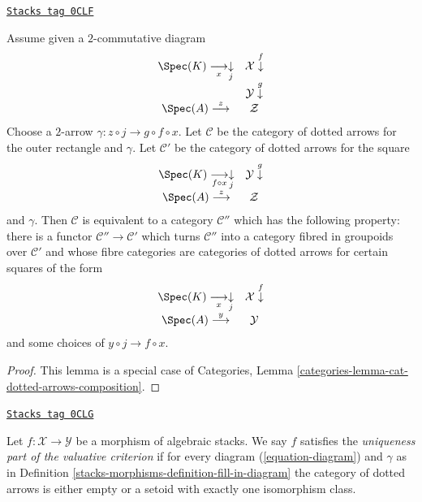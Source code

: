 \begin{lemma}
\label{stacks-morphisms-lemma-cat-dotted-arrows-composition}
\href{https://stacks.math.columbia.edu/tag/0CLF}{\texttt{Stacks tag 0CLF}}

Assume given a $2$-commutative diagram
$$
\begin{array}{cc}\Spec(K) \underset{x}{\longrightarrow}\underset{j}{\downarrow} & \mathcal{X} \overset{f}{\downarrow} \\  & \mathcal{Y} \overset{g}{\downarrow} \\ \Spec(A) \overset{z}{\longrightarrow} & \mathcal{Z}\end{array}
$$
Choose a $2$-arrow $\gamma : z \circ j \to g \circ f \circ x$.
Let $\mathcal{C}$ be the category of dotted arrows for
the outer rectangle and $\gamma$. Let $\mathcal{C}'$ be the
category of dotted arrows for the square
$$
\begin{array}{cc}\Spec(K) \underset{f \circ x}{\longrightarrow}\underset{j}{\downarrow} & \mathcal{Y} \overset{g}{\downarrow} \\ \Spec(A) \overset{z}{\longrightarrow} & \mathcal{Z}\end{array}
$$
and $\gamma$. Then $\mathcal{C}$ is equivalent to a category $\mathcal{C}''$
which has the following property: there is
a functor $\mathcal{C}'' \to \mathcal{C}'$
which turns $\mathcal{C}''$ into a category fibred in groupoids over
$\mathcal{C}'$ and whose fibre categories are categories of dotted arrows
for certain squares of the form
$$
\begin{array}{cc}\Spec(K) \underset{x}{\longrightarrow}\underset{j}{\downarrow} & \mathcal{X} \overset{f}{\downarrow} \\ \Spec(A) \overset{y}{\longrightarrow} & \mathcal{Y}\end{array}
$$
and some choices of $y \circ j \to f \circ x$.
\end{lemma}

\begin{proof}
This lemma is a special case of Categories,
Lemma \ref{categories-lemma-cat-dotted-arrows-composition}.
\end{proof}

\begin{definition}[Uniqueness]
\label{stacks-morphisms-definition-uniqueness}
\href{https://stacks.math.columbia.edu/tag/0CLG}{\texttt{Stacks tag 0CLG}}

Let $f : \mathcal{X} \to \mathcal{Y}$ be a morphism of algebraic stacks.
We say $f$ satisfies the {\it uniqueness part of the valuative criterion}
if for every diagram (\ref{equation-diagram}) and $\gamma$
as in Definition \ref{stacks-morphisms-definition-fill-in-diagram}
the category of dotted arrows is either empty or
a setoid with exactly one isomorphism class.
\end{definition}

